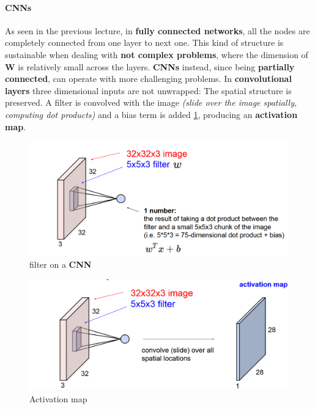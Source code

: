 \documentclass[11pt]{article}
\begin{document}
\paragraph{CNNs}

As seen in the previous lecture, in \textbf{fully connected networks}, all the nodes are completely connected from one layer to next one. This kind of structure is sustainable when dealing with \textbf{not complex problems}, where the dimension of \textbf{W} is relatively small across the layers.
\textbf{CNNs} instead, since being \textbf{partially connected}, can operate with more challenging problems.
In \textbf{convolutional layers}  three dimensional inputs are not unwrapped: The spatial structure is preserved. 
A filter is convolved  with the image \textit{(slide over the image spatially, computing dot products)} and a bias term is added \ref{fig:L410}, producing an \textbf{activation map}.\\
\begin{minipage}{0.5\textwidth}
\begin{figure} [H]
\centering 
\includegraphics[scale=0.28]{L410.pdf}
\caption{ filter on a \textbf{CNN}}
\label{fig:L410}
\end{figure}
\end{minipage}
\begin{minipage}{0.5\textwidth}
\begin{figure} [H]
\centering 
\includegraphics[scale=0.28]{L411.pdf}
\caption{Activation map}
\label{fig:L411}
\end{figure}
\end{minipage}\\\\
\end{document}
